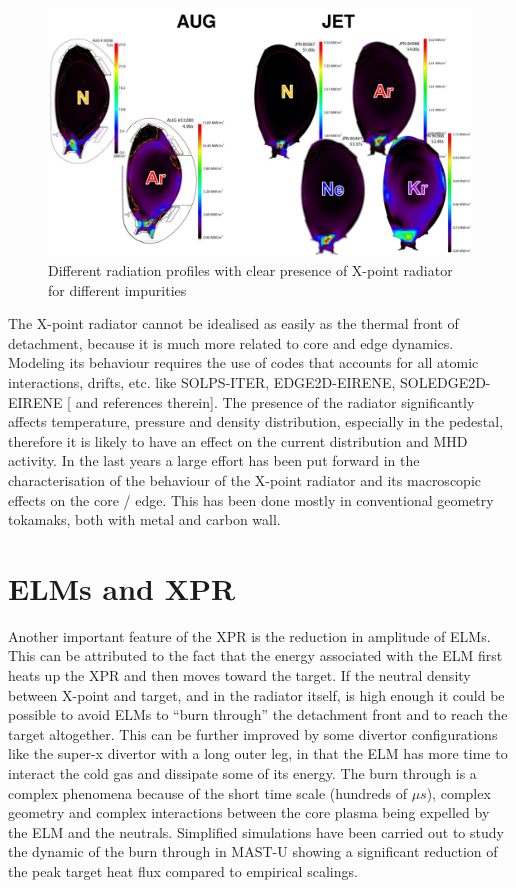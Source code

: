 \begin{figure}[!ht]
	\centering
	\includegraphics[width=\linewidth]{Chapters/chapter1/figs/xprs.png}
	\caption{Different radiation profiles with clear presence of X-point radiator for different impurities
	\cite{Wiesen2017}}
	\label{fig:xprs}
\end{figure}

The X-point radiator cannot be idealised as easily as the thermal front of detachment, because it is much more related to core and edge dynamics. Modeling its behaviour requires the use of codes that accounts for all atomic interactions, drifts, etc. like SOLPS-ITER, EDGE2D-EIRENE, SOLEDGE2D-EIRENE [\cite{Wiesen2017a} and references therein]. The presence of the radiator significantly affects temperature, pressure and density distribution, especially in the pedestal, therefore it is likely to have an effect on the current distribution and MHD activity.
In the last years a large effort has been put forward in the characterisation of the behaviour of the X-point radiator and its macroscopic effects on the core / edge. This has been done mostly in conventional geometry tokamaks, both with metal and carbon wall.


\section{ELMs and XPR}
Another important feature of the XPR is the reduction in amplitude of ELMs. This can be attributed to the fact that the energy associated with the ELM first heats up the XPR and then moves toward the target. If the neutral density between X-point and target, and in the radiator itself, is high enough it could be possible to avoid ELMs to “burn through” the detachment front and to reach the target altogether. \cite{Krasheninnikov2016} This can be further improved by some divertor configurations like the super-x divertor with a long outer leg, in that the ELM has more time to interact the cold gas and dissipate some of its energy. The burn through is a complex phenomena because of the short time scale (hundreds of $\mu s$), complex geometry and complex interactions between the core plasma being expelled by the ELM and the neutrals. Simplified simulations have been carried out to study the dynamic of the burn through in MAST-U showing a significant reduction of the peak target heat flux compared to empirical scalings.\cite{Smith2020,Smith2020a}


